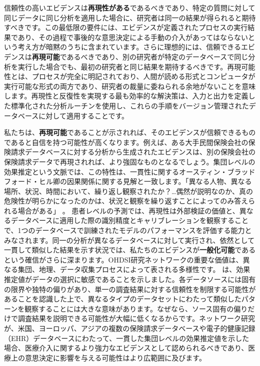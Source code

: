 \documentclass[
  11pt]{book}
\theoremstyle{definition}
\theoremstyle{definition}
\theoremstyle{definition}
\theoremstyle{definition}
\theoremstyle{remark}
\begin{document}
信頼性の高いエビデンスは\textbf{再現性がある}であるべきであり、特定の質問に対して同じデータに同じ分析を適用した場合に、研究者は同一の結果が得られると期待すべきです。この最低限の要件には、エビデンスが定義されたプロセスの実行結果であり、その過程で事後的な意思決定による手動の介入があってはならないという考え方が暗黙のうちに含まれています。さらに理想的には、信頼できるエビデンスは\textbf{再現可能}であるべきであり、別の研究者が特定のデータベースで同じ分析を実行した場合でも、最初の研究者と同じ結果を期待するべきです。再現可能性とは、プロセスが完全に明記されており、人間が読める形式とコンピュータが実行可能な形式の両方であり、研究者の裁量に委ねられる余地がないことを意味します。再現性と反復性を実現する最も効率的な解決策は、入力と出力を定義した標準化された分析ルーチンを使用し、これらの手順をバージョン管理されたデータベースに対して適用することです。

私たちは、\textbf{再現可能}であることが示されれば、そのエビデンスが信頼できるものであると自信を持つ可能性が高くなります。例えば、ある大手民間保険会社の保険請求データベースに対する分析から生成されたエビデンスは、別の保険会社の保険請求データで再現されれば、より強固なものとなるでしょう。集団レベルの効果推定という文脈では、この特性は、一貫性に関するオースティン・ブラッドフォード・ヒル卿の因果関係に関する見解と一致します。「異なる人物、異なる場所、状況、時間において、繰り返し観察されたか？\ldots 偶然が説明なのか、真の危険性が明らかになったのかは、状況と観察を繰り返すことによってのみ答えられる場合がある」\citep{hill_1965} 。 患者レベルの予測では、再現性は外部検証の価値と、異なるデータベースに適用した際の識別精度とキャリブレーションを観察することで、1つのデータベースで訓練されたモデルのパフォーマンスを評価する能力とみなされます。同一の分析が異なるデータベースに対して実行され、依然として一貫して類似した結果を示す状況では、私たちのエビデンスが\textbf{一般化可能}であるという確信がさらに深まります。OHDSI研究ネットワークの重要な価値は、異なる集団、地理、データ収集プロセスによって表される多様性です。 \citet{madigan_2013} は、効果推定値がデータの選択に敏感であることを示しました。各データソースには固有の限界や独特の偏りがあり、単一の調査結果に対する信頼性を制限する可能性があることを認識した上で、異なるタイプのデータセットにわたって類似したパターンを観察することには大きな意味があります。なぜなら、ソース固有の偏りだけで調査結果を説明できる可能性が大幅に低くなるからです。ネットワーク研究が、米国、ヨーロッパ、アジアの複数の保険請求データベースや電子的健康記録（EHR）データベースにわたって、一貫した集団レベルの効果推定値を示した場合、医療介入に関するより強力なエビデンスとして認められるべきであり、医療上の意思決定に影響を与える可能性はより広範囲に及びます。
\end{document}
